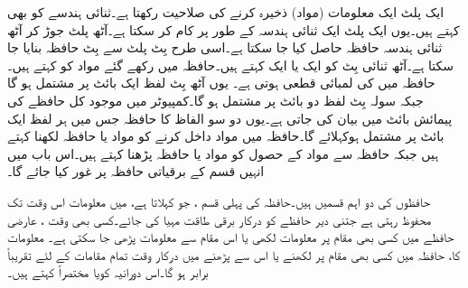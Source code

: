 ایک پلٹ ایک معلومات (مواد) ذخیرہ کرنے کی صلاحیت رکھتا ہے۔ثنائی ہندسے کو  بھی کہتے ہیں۔یوں ایک پلٹ ایک ثنائی ہندسہ  کے طور پر کام کر سکتا ہے۔آٹھ پلٹ جوڑ کر آٹھ ثنائی ہندسہ حافظہ حاصل کیا جا سکتا ہے۔اسی طرح  بِٹ پلٹ سے  بِٹ حافظہ بنایا جا سکتا ہے۔آٹھ ثنائی بِٹ کو ایک  یا ایک  کہتے ہیں۔حافظہ میں رکھے گئے مواد کو کہتے ہیں۔حافظہ میں  کی لمبائی قطعی ہوتی ہے۔ یوں آٹھ بِٹ لفظ ایک بائٹ پر مشتمل ہو گا جبکہ سولہ بِٹ لفظ دو بائٹ پر مشتمل ہو گا۔کمپیوٹر میں موجود کل حافظے کی پیمائش بائٹ میں بیان کی جاتی ہے۔یوں دو سو الفاظ کا حافظہ جس میں ہر لفظ ایک بائٹ پر مشتمل ہوکہلائے گا۔حافظہ میں مواد داخل کرنے کو مواد یا حافظہ لکھنا کہتے ہیں جبکہ حافظہ سے مواد کے حصول کو مواد  یا حافظہ پڑھنا کہتے ہیں۔اس باب میں انہیں قسم کے برقیاتی حافظہ پر غور کیا جائے گا۔


حافظوں کی دو اہم قسمیں ہیں۔حافظہ کی پہلی قسم ، جو  کہلاتا ہے، میں معلومات اس وقت تک محفوظ رہتی ہے جتنی دیر حافظے کو درکار برقی طاقت مہیا کی جائے۔کسی بھی وقت ، عارضی حافظے میں کسی بھی مقام پر معلومات لکھی یا اس مقام سے معلومات پڑھی جا سکتی ہے۔ معلومات کا، حافظہ میں کسی بھی مقام پر لکھنے یا اس سے پڑھنے میں درکار وقت تمام مقامات کے لئے تقریباً برابر ہو گا۔اس دورانیہ کویا مختصراً  کہتے ہیں۔


